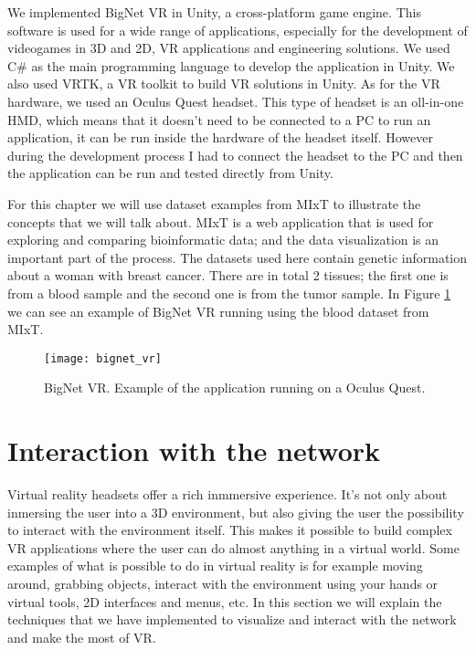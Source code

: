 We implemented BigNet VR in Unity, a cross-platform game engine. This software is used for a wide range of applications, especially for the development of videogames in 3D and 2D, VR applications and engineering solutions. We used C\# as the main programming language to develop the application in Unity. We also used VRTK, a VR toolkit to build VR solutions in Unity. As for the VR hardware, we used an Oculus Quest headset. This type of headset is an oll-in-one HMD, which means that it doesn't need to be connected to a PC to run an application, it can be run inside the hardware of the headset itself. However during the development process I had to connect the headset to the PC and then the application can be run and tested directly from Unity.

For this chapter we will use dataset examples from MIxT to illustrate the concepts that we will talk about. MIxT is a web application that is used for exploring and comparing bioinformatic data\cite{fjukstad_dumeaux_olsen_lund_hallett_bongo_2017}\cite{dumeaux_fjukstad_interactions_tumor_blood}; and the data visualization is an important part of the process. The datasets used here contain genetic information about a woman with breast cancer. There are in total 2 tissues; the first one is from a blood sample and the second one is from the tumor sample. In Figure \ref{fig:bignet_vr} we can see an example of BigNet VR running using the blood dataset from MIxT.

\begin{figure}[h!]
    \setlength{\tempheight}{15ex}
    \centering
    \texttt{[image: bignet\_vr]}
    \caption{BigNet VR. Example of the application running on a Oculus Quest.}
    \label{fig:bignet_vr}
\end{figure}

\section{Interaction with the network}
Virtual reality headsets offer a rich inmmersive experience. It's not only about inmersing the user into a 3D environment, but also giving the user the possibility to interact with the environment itself. This makes it possible to build complex VR applications where the user can do almost anything in a virtual world. Some examples of what is possible to do in virtual reality is for example moving around, grabbing objects, interact with the environment using your hands or virtual tools, 2D interfaces and menus, etc. In this section we will explain the techniques that we have implemented to visualize and interact with the network and make the most of VR.


